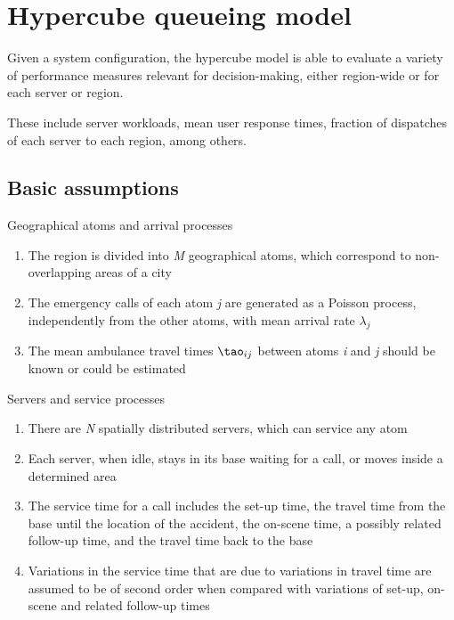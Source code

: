

\section{Hypercube queueing model}
\begin{frame}
Given a system configuration, 
the hypercube model is able to evaluate a variety of performance
measures relevant for decision-making, 
either region-wide or for each server or region.

These include 
server workloads, 
mean user response times, 
fraction of dispatches of each server to each region,
among others.
\end{frame}

\subsection{Basic assumptions}
\begin{frame}{Geographical atoms and arrival processes}
  \begin{enumerate}
  \item The region is divided into \textit{M} geographical atoms,
    which correspond to non-overlapping areas of a city
  \item The emergency calls of each atom \textit{j} are generated as a Poisson
    process, independently from the other atoms, with mean arrival rate $\lambda_j$
  \item The mean ambulance travel times $\tao_{ij}$ between
    atoms \textit{i} and \textit{j} should be known or could be estimated
  \end{enumerate}
\end{frame}

\begin{frame}{Servers and service processes}
  \begin{enumerate}
  \item There are \textit{N} spatially distributed servers, 
    which can service any atom
  \item Each server, when idle, stays in its base waiting for a call, 
    or moves inside a determined area
  \item The service time for a call includes the set-up time, 
    the travel time from the base until the location of the accident, 
    the on-scene time, a possibly related follow-up time, 
    and the travel time back to the base
  \item Variations in the service time that are due to variations in travel time 
    are assumed to be of second order when compared with variations of set-up, 
    on-scene and related follow-up times
  \end{enumerate}
\end{frame}

